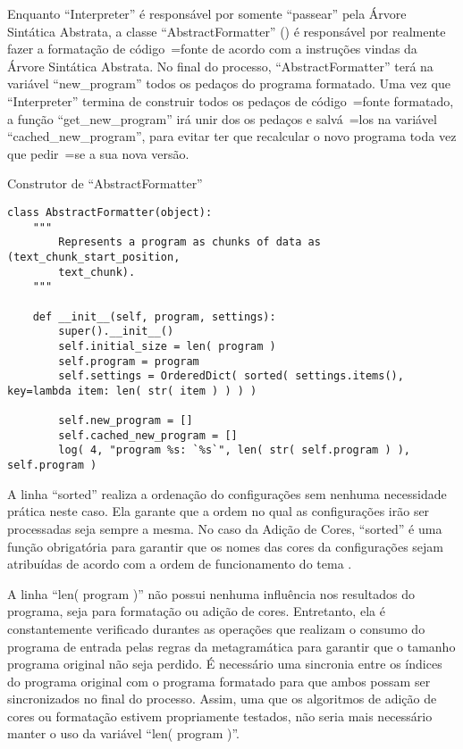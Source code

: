 Enquanto ``Interpreter'' é responsável por somente ``passear'' pela Árvore Sintática Abstrata,
a classe ``AbstractFormatter'' () é responsável por realmente fazer a formatação de código~=fonte de acordo com a instruções vindas da Árvore Sintática Abstrata.
No final do processo,
``AbstractFormatter'' terá na variável ``new\_program'' todos os pedaços do programa formatado.
Uma vez que ``Interpreter'' termina de construir todos os pedaços de código~=fonte formatado,
a função ``get\_new\_program'' irá unir dos os pedaços e
salvá~=los na variável ``cached\_new\_program'',
para evitar ter que recalcular o novo programa toda vez que pedir~=se a sua nova versão.
\begin{code}
\caption{Construtor de ``AbstractFormatter''}
\label{construtorDeParsedProgram}
\begin{verbatim}
class AbstractFormatter(object):
    """
        Represents a program as chunks of data as (text_chunk_start_position,
        text_chunk).
    """

    def __init__(self, program, settings):
        super().__init__()
        self.initial_size = len( program )
        self.program = program
        self.settings = OrderedDict( sorted( settings.items(), key=lambda item: len( str( item ) ) ) )

        self.new_program = []
        self.cached_new_program = []
        log( 4, "program %s: `%s`", len( str( self.program ) ), self.program )
\end{verbatim}
\end{code}

A linha ``sorted'' realiza a ordenação do configurações sem nenhuma necessidade prática neste caso.
Ela garante que a ordem no qual as configurações irão ser processadas seja sempre a mesma.
No caso da Adição de Cores,
``sorted'' é uma função obrigatória para garantir que os nomes das cores da configurações sejam atribuídas de acordo com a ordem de funcionamento do tema \cite{vsCodeSyntaxHighlighthing,sublimeTextScopeNaming}.

A linha ``len( program )'' não possui nenhuma influência nos resultados do programa,
seja para formatação ou
adição de cores.
Entretanto,
ela é constantemente verificado durantes as operações que realizam o consumo do programa de entrada pelas regras da metagramática para garantir que o tamanho programa original não seja perdido.
É necessário uma sincronia entre os índices do programa original com o programa formatado para que ambos possam ser sincronizados no final do processo.
Assim,
uma que os algoritmos de adição de cores ou
formatação estivem propriamente testados,
não seria mais necessário manter o uso da variável ``len( program )''.

